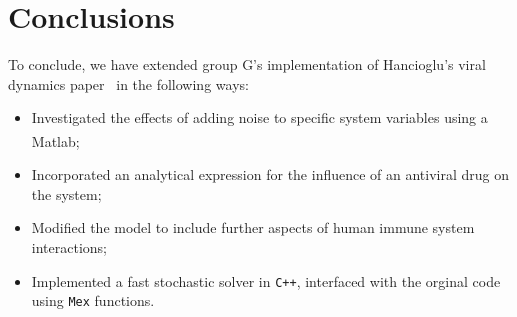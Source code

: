 \documentclass[a4paper, 12pt]{report}
\begin{document}
\chapter*{Conclusions}

To conclude, we have extended group G's implementation of Hancioglu's viral dynamics paper~\cite{Hancioglu} in the following ways:
\begin{itemize}
\item Investigated the effects of adding noise to specific system variables using a Matlab\textsuperscript{\textregistered}; 
\item Incorporated an analytical expression for the influence of an antiviral drug on the system;
\item Modified the model to include further aspects of human immune system interactions;
\item Implemented a fast stochastic solver in \texttt{C++}, interfaced with the orginal code using \texttt{Mex} functions. 
\end{itemize}




\end{document}
